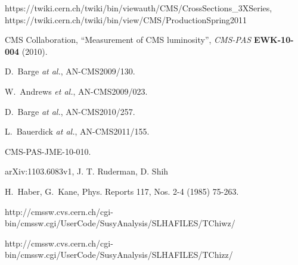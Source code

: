 \begin{thebibliography}{10}
 https://twiki.cern.ch/twiki/bin/viewauth/CMS/CrossSections\_3XSeries, 
https://twiki.cern.ch/twiki/bin/view/CMS/ProductionSpring2011

{CMS Collaboration}, ``Measurement of CMS luminosity'', {\em CMS-PAS} {\bf
  EWK-10-004} (2010).

 D.~Barge {\em at al.}, AN-CMS2009/130.

 W.~Andrews {\em et al.}, AN-CMS2009/023.

 D.~Barge {\em at al.}, AN-CMS2010/257.

 L.~Bauerdick {\em at al.}, AN-CMS2011/155.

 CMS-PAS-JME-10-010.

 arXiv:1103.6083v1, J. T. Ruderman, D. Shih

H.~Haber, G.~Kane, Phys. Reports 117, Nos. 2-4 (1985) 75-263.

 http://cmssw.cvs.cern.ch/cgi-bin/cmssw.cgi/UserCode/SusyAnalysis/SLHAFILES/TChiwz/

 http://cmssw.cvs.cern.ch/cgi-bin/cmssw.cgi/UserCode/SusyAnalysis/SLHAFILES/TChizz/

\end{thebibliography}
